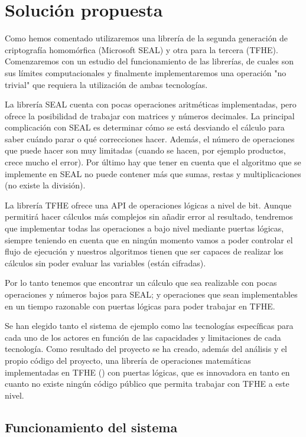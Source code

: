 \chapter{Solución propuesta}
\label{chap:poc}

Como hemos comentado utilizaremos una librería de la segunda generación de criptografía homomórfica (Microsoft SEAL) y otra para la tercera (TFHE). Comenzaremos con un estudio del funcionamiento de las librerías, de cuales son sus límites computacionales y finalmente implementaremos una operación "no trivial" que requiera la utilización de ambas tecnologías.

La librería SEAL cuenta con pocas operaciones aritméticas implementadas, pero ofrece la posibilidad de trabajar con matrices y números decimales. La principal complicación con SEAL es determinar cómo se está desviando el cálculo para saber cuándo parar o qué correcciones hacer. Además, el número de operaciones que puede hacer son muy limitadas (cuando se hacen, por ejemplo productos, crece mucho el error). Por último hay que tener en cuenta que el algoritmo que se implemente en SEAL no puede contener más que sumas, restas y multiplicaciones (no existe la división).

La librería TFHE ofrece una API de operaciones lógicas a nivel de bit. Aunque permitirá hacer cálculos más complejos sin añadir error al resultado, tendremos que implementar todas las operaciones a bajo nivel mediante puertas lógicas, siempre teniendo en cuenta que en ningún momento vamos a poder controlar el flujo de ejecución y nuestros algoritmos tienen que ser capaces de realizar los cálculos sin poder evaluar las variables (están cifradas).

Por lo tanto tenemos que encontrar un cálculo que sea realizable con pocas operaciones y números bajos para SEAL; y operaciones que sean implementables en un tiempo razonable con puertas lógicas para poder trabajar en TFHE.

Se han elegido tanto el sistema de ejemplo como las tecnologías específicas para cada uno de los actores en función de las capacidades y limitaciones de cada tecnología. Como resultado del proyecto se ha creado, además del análisis y el propio código del proyecto, una librería de operaciones matemáticas implementadas en TFHE (\cite{junquera_tfhe_2019}) con puertas lógicas, que es innovadora en tanto en cuanto no existe ningún código público que permita trabajar con TFHE a este nivel.

\section{Funcionamiento del sistema}

